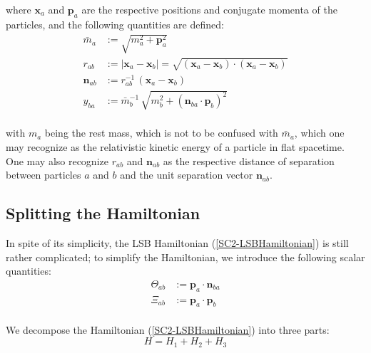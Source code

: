 \documentclass[aps,onecolumn,notitlepage,eqsecnum,nofootinbib,floatfix,superscriptaddress]{revtex4-1}
\begin{document}
\noindent where $\textbf{x}_a$ and $\textbf{p}_a$ are the respective positions and conjugate momenta of the particles, and the following quantities are defined:
\begin{equation} \label{SC2-LSBHamiltonianDefns}
\begin{aligned} 
\bar{m}_a &:=\sqrt{m_a^2+\textbf{p}_a^2}\\
r_{ab}&:=|\textbf{x}_a - \textbf{x}_b|=\sqrt{\left(\textbf{x}_a - \textbf{x}_b\right)\cdot\left(\textbf{x}_a - \textbf{x}_b\right)}\\
\textbf{n}_{ab} &:=r_{ab}^{-1}\,(\textbf{x}_a - \textbf{x}_b)\\
y_{ba}&:=\bar{m}_b^{-1}\,\sqrt{m^{2}_{b}+\left(\mathbf{n}_{ba} \cdot \mathbf{p}_{b}\right)^{2}}\\
\end{aligned}
\end{equation}

\noindent with $m_a$ being the rest mass, which is not to be confused with $\bar{m}_a$, which one may recognize as the relativistic kinetic energy of a particle in flat spacetime. One may also recognize $r_{ab}$ and $\textbf{n}_{ab}$ as the respective distance of separation between particles $a$ and $b$ and the unit separation vector $\textbf{n}_{ab}$.



%
%
\subsection{Splitting the Hamiltonian}
In spite of its simplicity, the LSB Hamiltonian (\ref{SC2-LSBHamiltonian}) is still rather complicated; to simplify the Hamiltonian, we introduce the following scalar quantities:
\begin{equation} \label{ThetaXi}
\begin{aligned}
\Theta_{ab} &:= \mathbf{p}_{a}\cdot\mathbf{n}_{ba}\\
\Xi_{ab} &:= \mathbf{p}_{a}\cdot\mathbf{p}_{b}\\
\end{aligned}
\end{equation}

\noindent We decompose the Hamiltonian (\ref{SC2-LSBHamiltonian})
into three parts:
\begin{equation} \label{HamiltonianDecomp}
H= H_{1}+ H_{2}+ H_{3}
\end{equation}
\end{document}
